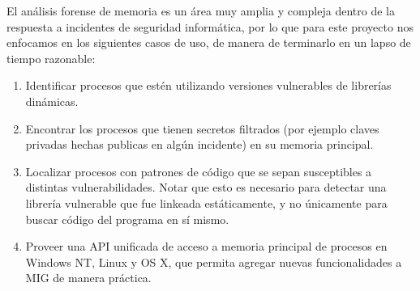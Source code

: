 El análisis forense de memoria es un área muy amplia y compleja dentro de la
respuesta a incidentes de seguridad informática, por lo que para este proyecto
nos enfocamos en los siguientes casos de uso, de manera de terminarlo en un
lapso de tiempo razonable:

\begin{enumerate}

\item Identificar procesos que estén utilizando versiones vulnerables de librerías
    dinámicas.

\item Encontrar los procesos que tienen secretos filtrados (por ejemplo claves
    privadas hechas publicas en algún incidente) en su memoria principal.

\item Localizar procesos con patrones de código que se sepan susceptibles a
    distintas vulnerabilidades. Notar que esto es necesario para detectar una librería
    vulnerable que fue linkeada estáticamente, y no únicamente para buscar código del
    programa en sí mismo.

\item Proveer una API unificada de acceso a memoria principal de procesos en
    Windows NT, Linux y OS X, que permita agregar nuevas funcionalidades a MIG
    de manera práctica.

\end{enumerate}
